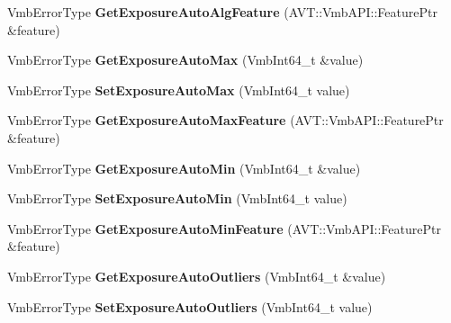 \begin{DoxyCompactItemize}
\item 
\hypertarget{classMakoCamera_a9eec1c8e5f93dcbeb1e8ad3736d54aae}{Vmb\-Error\-Type {\bfseries Get\-Exposure\-Auto\-Alg\-Feature} (A\-V\-T\-::\-Vmb\-A\-P\-I\-::\-Feature\-Ptr \&feature)}\label{classMakoCamera_a9eec1c8e5f93dcbeb1e8ad3736d54aae}

\item 
\hypertarget{classMakoCamera_a53e9ba5ba0b9e8169ac125edb903e077}{Vmb\-Error\-Type {\bfseries Get\-Exposure\-Auto\-Max} (Vmb\-Int64\-\_\-t \&value)}\label{classMakoCamera_a53e9ba5ba0b9e8169ac125edb903e077}

\item 
\hypertarget{classMakoCamera_a92ecf238e705a0d7aef798febcfba0f9}{Vmb\-Error\-Type {\bfseries Set\-Exposure\-Auto\-Max} (Vmb\-Int64\-\_\-t value)}\label{classMakoCamera_a92ecf238e705a0d7aef798febcfba0f9}

\item 
\hypertarget{classMakoCamera_a1d56cde61a5b3674e7f4c324a33b33d6}{Vmb\-Error\-Type {\bfseries Get\-Exposure\-Auto\-Max\-Feature} (A\-V\-T\-::\-Vmb\-A\-P\-I\-::\-Feature\-Ptr \&feature)}\label{classMakoCamera_a1d56cde61a5b3674e7f4c324a33b33d6}

\item 
\hypertarget{classMakoCamera_a357d35f74535e4d19f44e129eade193a}{Vmb\-Error\-Type {\bfseries Get\-Exposure\-Auto\-Min} (Vmb\-Int64\-\_\-t \&value)}\label{classMakoCamera_a357d35f74535e4d19f44e129eade193a}

\item 
\hypertarget{classMakoCamera_a93fc309ed92139371e8fb0fa829debcf}{Vmb\-Error\-Type {\bfseries Set\-Exposure\-Auto\-Min} (Vmb\-Int64\-\_\-t value)}\label{classMakoCamera_a93fc309ed92139371e8fb0fa829debcf}

\item 
\hypertarget{classMakoCamera_ad2560b8358b6f34d0a38335c747f35ab}{Vmb\-Error\-Type {\bfseries Get\-Exposure\-Auto\-Min\-Feature} (A\-V\-T\-::\-Vmb\-A\-P\-I\-::\-Feature\-Ptr \&feature)}\label{classMakoCamera_ad2560b8358b6f34d0a38335c747f35ab}

\item 
\hypertarget{classMakoCamera_af9770a46c40f9f13d9a8e406b6dc11b8}{Vmb\-Error\-Type {\bfseries Get\-Exposure\-Auto\-Outliers} (Vmb\-Int64\-\_\-t \&value)}\label{classMakoCamera_af9770a46c40f9f13d9a8e406b6dc11b8}

\item 
\hypertarget{classMakoCamera_a9a2a079179b0a0ad1c1a295e65d3c46a}{Vmb\-Error\-Type {\bfseries Set\-Exposure\-Auto\-Outliers} (Vmb\-Int64\-\_\-t value)}\label{classMakoCamera_a9a2a079179b0a0ad1c1a295e65d3c46a}


\end{DoxyCompactItemize}

